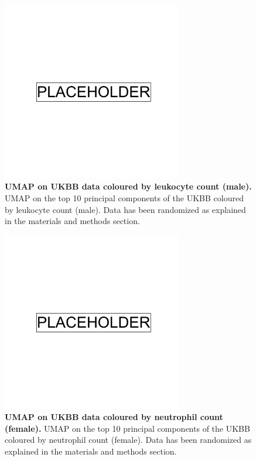 \newpage

\begin{figure}
    \centering
    \includegraphics[width=0.7\textwidth]{placeholder.png}
    \caption[UMAP on UKBB data coloured by leukocyte count (male)]{\textbf{UMAP on UKBB data coloured by leukocyte count (male).} UMAP on the top 10 principal components of the UKBB coloured by leukocyte count (male). Data has been randomized as explained in the materials and methods section.}
    \label{fig:supp_ukbb_leukocyte_m}
\end{figure}

\newpage

\begin{figure}
    \centering
    \includegraphics[width=0.7\textwidth]{placeholder.png}
    \caption[UMAP on UKBB data coloured by neutrophil count (female)]{\textbf{UMAP on UKBB data coloured by neutrophil count (female).} UMAP on the top 10 principal components of the UKBB coloured by neutrophil count (female). Data has been randomized as explained in the materials and methods section.}
    \label{fig:supp_ukbb_neutrophill_f}
\end{figure}

